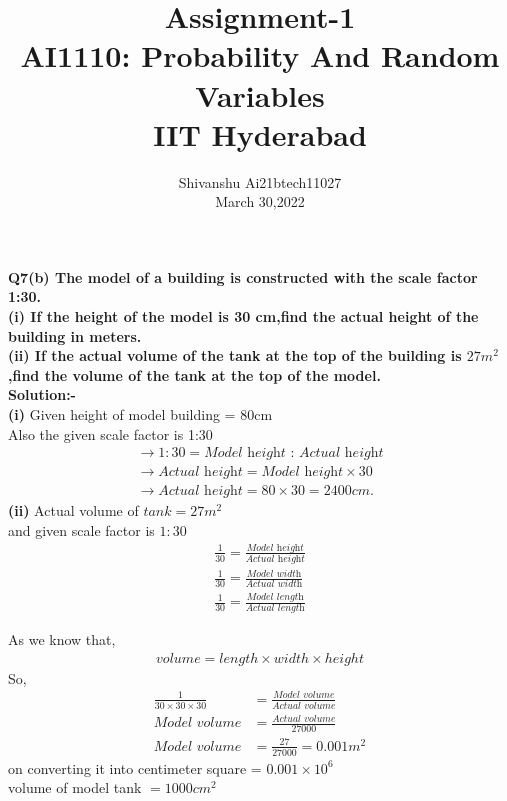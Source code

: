 \documentclass[12pt]{IEEEtran}
\title{\textbf{Assignment-1}\\ \large AI1110: Probability And Random Variables\\ IIT Hyderabad}
\author{Shivanshu  Ai21btech11027\\ March 30,2022}
\begin{document}
\maketitle
 \textbf{Q7(b)\hspace{1mm} The model of a building is constructed with the scale factor 1:30.}\\

 \textbf{(i) If the height of the model is 30 cm,find the actual height of the building in meters.}\\

 \textbf{(ii) If the actual volume of the tank at the top of the building is $ 27m^2 $,find the volume of the tank at the top of the model.}\\
 
 \textbf{Solution:-}\\
 \textbf{(i)}
 Given height of model building = 80cm\\
 Also the given scale factor is 1:30\\
\begin{align}
 \rightarrow 1 : 30 = \textit{Model height : Actual height} \\
 \rightarrow \textit{Actual height} = \textit{Model height}\times 30 \\
 \rightarrow \textit{Actual height} = 80 \times 30 = 2400 cm.
\end{align}
 \textbf{(ii)}
 Actual volume of $tank = 27m^2 $\\
 and given  scale factor is $ 1:30 $\\

\begin{align}
 \frac{1}{30} = \frac{\textit{Model height}}{\textit{Actual height}}\\
 \frac{1}{30} = \frac{\textit{Model width}}{\textit{Actual width}}\\
 \frac{1}{30} = \frac{\textit{Model length}}{\textit{Actual length}}
\end{align}

 As we know that,
 \begin{align}
 volume = length\times width\times height
 \end{align}
 So,
 \begin{align}
 \frac{1}{30\times30\times30} &= \frac{\textit{Model volume}}{\textit{Actual volume}} \\
 \textit{Model volume} &= \frac{\textit{Actual volume}}{27000} \\
 \textit{Model volume} &= \frac{27}{27000} = 0.001m^2
 \end{align}
 on converting it into centimeter square = $0.001 \times 10^6$\\
 volume of model tank $= 1000 cm^2$\\
\end{document}
